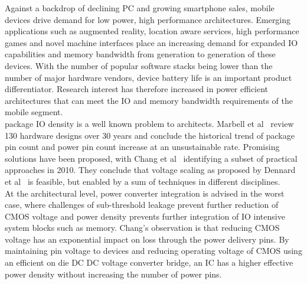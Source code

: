 \documentclass[letterpaper,twocolumn,10pt]{article}
\begin{document}

Against a backdrop of declining PC and growing smartphone sales, mobile devices drive demand for low power, high performance architectures. Emerging applications such as augmented reality, location aware services, high performance games and novel machine interfaces place an increasing demand for expanded IO capabilities and memory bandwidth from generation to generation of these devices. With the number of popular software stacks being lower than the number of major hardware vendors, device battery life is an important product differentiator. Research interest has therefore increased in power efficient architectures that can meet the IO and memory bandwidth requirements of the mobile segment.\\
\indent package IO density is a well known problem to architects. Marbell et al~\cite{Marbell2011} review 130 hardware designs over 30 years and conclude the historical trend of package pin count and power pin count increase at an unsustainable rate. Promising solutions have been proposed, with Chang et al~\cite{Chang2010} identifying a subset of practical approaches in 2010. They conclude that voltage scaling as proposed by Dennard et al~\cite{Dennard1974} is feasible, but enabled by a sum of techniques in different disciplines.\\
At the architectural level, power converter integration is advised in the worst case, where challenges of sub-threshold leakage prevent further reduction of CMOS voltage and power density prevents further integration of IO intensive system blocks such as memory. Chang's observation is that reducing CMOS voltage has an exponential impact on loss through the power delivery pins. By maintaining pin voltage to devices and reducing operating voltage of CMOS using an efficient on die DC DC voltage converter bridge, an IC has a higher effective power density without increasing the number of power pins.\\
\end{document}
